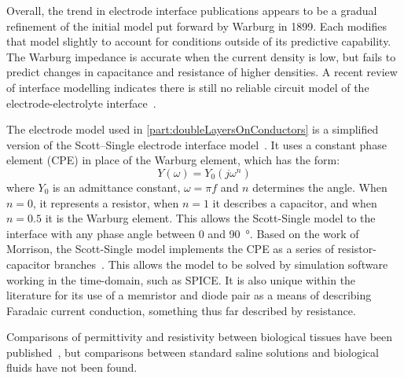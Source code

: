     Overall, the trend in electrode interface publications appears to be a gradual refinement of the initial model put forward by Warburg in 1899.
    Each modifies that model slightly to account for conditions outside of its predictive capability.
    The Warburg impedance is accurate when the current density is low, but fails to predict changes in capacitance and resistance of higher densities.
    A recent review of interface modelling indicates there is still no reliable circuit model of the electrode-electrolyte interface~\cite{Geddes1997}.

    The electrode model used in \cref{part:doubleLayersOnConductors} is a simplified version of the Scott--Single electrode interface model~\cite{Scott2014}.
    It uses a constant phase element (CPE) in place of the Warburg element, which has the form:
    \begin{equation}
      Y(\omega) = Y_0 (j\omega^n)
      \label{eqn:CPE_equation}
    \end{equation}
    where $Y_0$ is an admittance constant, $\omega = \pi f$ and $n$ determines the angle.
    When $n=0$, it represents a resistor, when $n=1$ it describes a capacitor, and when $n=0.5$ it is the Warburg element.
    This allows the Scott-Single model to the interface with any phase angle between 0 and \SI{90}{\degree}.
    Based on the work of Morrison, the Scott-Single model implements the CPE as a series of resistor-capacitor branches~\cite{Morrison1959}.
    This allows the model to be solved by simulation software working in the time-domain, such as SPICE.
    It is also unique within the literature for its use of a memristor and diode pair as a means of describing Faradaic current conduction, something thus far described by resistance.

    Comparisons of permittivity and resistivity between biological tissues have been published~\cite{Gabriel1996}, but comparisons between standard saline solutions and biological fluids have not been found.

